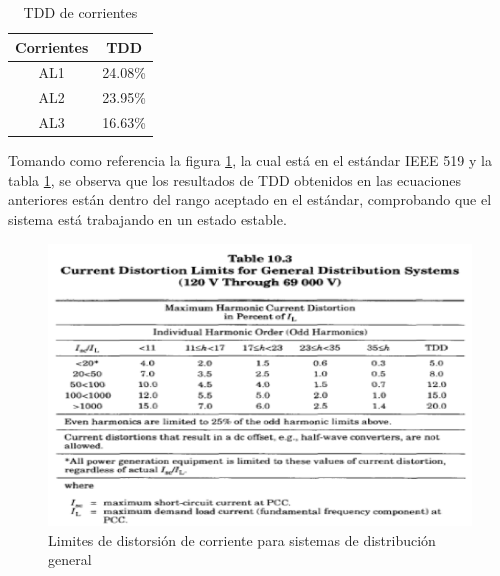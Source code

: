 \begin{table}[!htbp]
\begin{center}
\begin{tabular}{ |c|c| } 
\hline
Corrientes & TDD\\
\hline
AL1 & 24.08\%\\
\hline
AL2 & 23.95\%\\
\hline
AL3 & 16.63\%\\
\hline
\end{tabular}
\end{center}
\caption{TDD de corrientes}
\label{tab:tdd-corriente}
\end{table}

Tomando como referencia la figura \ref{fig:limites-corriente}, la cual está en el estándar IEEE 519 y la tabla \ref{tab:tdd-corriente}, se observa que los resultados de TDD obtenidos en las ecuaciones anteriores están dentro del rango aceptado en el estándar, comprobando que el sistema está trabajando en un estado estable. 

\begin{figure}[H]
\centering
\includegraphics{2Marco/limites-distorsion-corriente}
\caption{Limites de distorsión de corriente para sistemas de distribución general} 
\label{fig:limites-corriente}
\end{figure} 